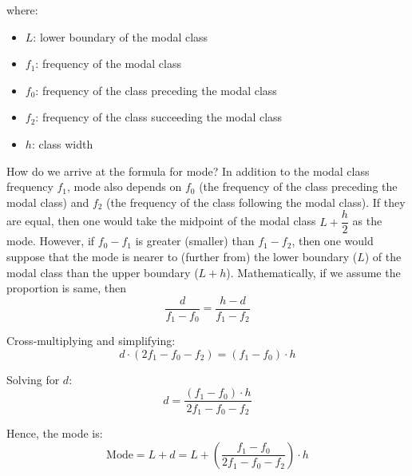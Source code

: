\documentclass[twoside]{book}
\begin{document}
\begin{enumerate}
where:
\begin{itemize}
    \item \( L \): lower boundary of the modal class
    \item \( f_1 \): frequency of the modal class
    \item \( f_0 \): frequency of the class preceding the modal class
    \item \( f_2 \): frequency of the class succeeding the modal class
    \item \( h \): class width
\end{itemize}

How do we arrive at the formula for mode? In addition to the modal class frequency $f_1$, mode also depends on $f_0$ (the frequency of the class preceding the modal class) and $f_2$ (the frequency of the class following the modal class). If they are equal, then one would take the midpoint of the modal class $L+ \dfrac{h}{2}$ as the mode. However, if $f_0-f_1$ is greater (smaller) than $f_1-f_2$, then one would suppose that the mode is nearer to (further from) the lower boundary ($L$) of the modal class than the upper boundary ($L+h$). Mathematically, if we assume the proportion is same, then
\[
\frac{d}{f_1 - f_0} = \frac{h - d}{f_1 - f_2}
\]

Cross-multiplying and simplifying:
\[
d\cdot (2f_1 - f_0 - f_2) = (f_1 - f_0)\cdot h
\]

Solving for \( d \):
\[
d = \frac{(f_1 - f_0)\cdot h}{2f_1 - f_0 - f_2}
\]

Hence, the mode is:
\[
\text{Mode} = L + d = L + \left( \frac{f_1 - f_0}{2f_1 - f_0 - f_2} \right) \cdot h
\]

\begin{center}
\end{center}
\end{enumerate}
\end{document}
